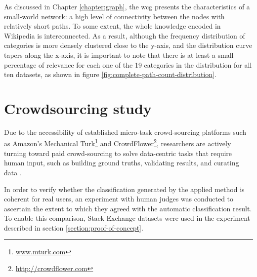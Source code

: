 \begin{displayquote}
\end{displayquote}

As discussed in Chapter \ref{chapter:graph}, the \gls{wcg} presents the characteristics of a small-world network: a high level of connectivity between the nodes with relatively short paths.  To some extent, the whole knowledge encoded in Wikipedia is interconnected. As a result, although the frequency distribution of categories is more densely clustered close to the y-axis, and the distribution curve tapers along the x-axis,  it is important to note that there is at least a small percentage of relevance for each one of the 19 categories in the distribution for all ten datasets, as shown in figure \ref{fig:complete-path-count-distribution}. 

\section{\hspace*{3pt} Crowdsourcing study}

Due to the accessibility of established micro-task crowd-sourcing platforms such as Amazon’s Mechanical Turk\footnote{\url{www.mturk.com}} and CrowdFlower\footnote{\url{http://crowdflower.com}}, researchers are actively turning toward paid crowd-sourcing to solve data-centric tasks that require human input, such as building ground truths, validating results, and curating data \cite{7156008}.

\label{sec:crowd-sourcing-study}
In order to verify whether the classification generated by the applied method is coherent for real users, an experiment with human judges was conducted to ascertain the extent to which they agreed with the automatic classification result. To enable this comparison, Stack Exchange datasets were used in the experiment described in section \ref{section:proof-of-concept}.


